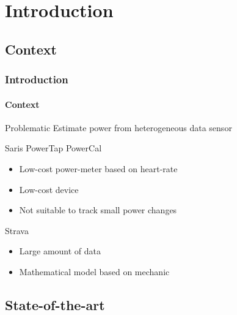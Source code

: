 \documentclass{beamer}
\newcommand{\tick}{\color{green!60!black!80}\ding{51}}
\newcommand{\cross}{\color{red!60!black!80}\ding{55}}
\begin{document}
\section{Introduction}

\subsection{Context}

\begin{frame}
  \frametitle{Introduction}
  \framesubtitle{Context}
  \begin{block}{\small Problematic}\centering
    Estimate power from heterogeneous data sensor
  \end{block}
  \begin{block}{\small Saris PowerTap PowerCal}
    \begin{itemize}\small
    \item Low-cost power-meter based on heart-rate
    \item[\tick] Low-cost device
    \item[\cross] Not suitable to track small power changes
    \end{itemize}
  \end{block}
  \begin{block}{\small Strava}
    \begin{itemize}\small
    \item Large amount of data
    \item Mathematical model based on mechanic
    \end{itemize}
  \end{block}
\end{frame}

\subsection{State-of-the-art}
\end{document}

